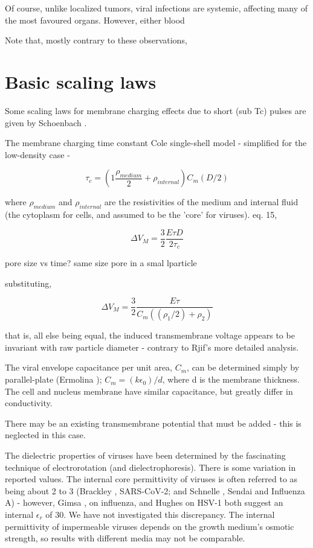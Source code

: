 \documentclass[fleqn,10pt]{article}
\begin{document}
Of course, unlike localized tumors, viral infections are systemic, affecting many of the most favoured organs. However, either blood 

Note that, mostly contrary to these observations, 


\cite{Nanosecond2006b} 






\section*{Basic scaling laws}


Some scaling laws for membrane charging effects due to short (sub Tc) pulses are given by Schoenbach \cite{Bioelectric2007}. 

The membrane charging time constant Cole single-shell model \cite{Ultrashort2004} - simplified for the low-density case - 

$$\tau_c = \left(1 \frac{\rho_{medium}}{2} + \rho_{internal}\right) C_m (D/2)$$

where $\rho_{medium}$ and $\rho_{internal}$ are the resistivities of the medium and internal fluid (the cytoplasm for cells, and assumed to be the 'core' for viruses). \cite{Bioelectric2007} eq. 15, 

$$\Delta V_M = \frac{3}{2}\frac{E\tau D}{2 \tau_c }$$


pore size vs time? same size pore in a smal lparticle 

substituting,

$$\Delta V_M = \frac{3}{2}\frac{E \tau}{C_m ((\rho_1/2) + \rho_2)}$$

that is, all else being equal, the induced transmembrane voltage appears to be invariant with raw particle diameter - contrary to Rjif's more detailed analysis.

The viral envelope capacitance per unit area, $C_m$, can be determined simply by parallel-plate (Ermolina \cite{Study2001}); $C_m = (k\epsilon_0) / d$, where d is the membrane thickness. The cell and nucleus membrane have similar capacitance, but greatly differ in conductivity. 

There may be an existing transmembrane potential that must be added - this is neglected in this case.

The dielectric properties of viruses have been determined by the fascinating technique of electrorotation (and dielectrophoresis). There is some variation in reported values. The internal core permittivity of viruses is often referred to as being about 2 to 3 (Brackley \cite{Electrostatic2020}, SARS-CoV-2; and Schnelle \cite{Trapping1996}, Sendai and Influenza A) - however, Gimsa \cite{New1999}, on influenza, and Hughes\cite{Dielectrophoretic2001} on HSV-1 both suggest an internal $\epsilon_r$ of 30. We have not investigated this discrepancy. The internal permittivity of impermeable viruses depends on the growth medium's osmotic strength\cite{Osmotic2003}, so results with different media may not be comparable.
\end{document}
